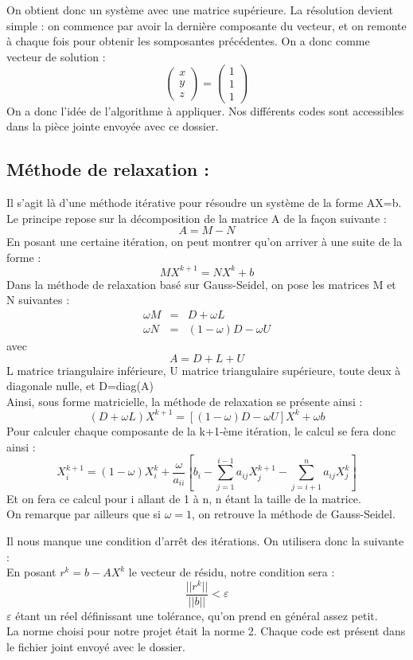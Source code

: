 \documentclass{article}
\theoremstyle{mes_theoremes}
\begin{document}
On obtient donc un système avec une matrice supérieure. La résolution devient simple : on commence par avoir la dernière composante du vecteur, et on remonte à chaque fois pour obtenir les somposantes précédentes. On a donc comme vecteur de solution : 
\[
\left(\begin{matrix}
   x\\
   y\\
   z
\end{matrix}\right)
=\left(\begin{matrix}
   1\\
   1\\
   1
\end{matrix}\right)
\]
On a donc l'idée de l'algorithme à appliquer. Nos différents codes sont accessibles dans la pièce jointe envoyée avec ce dossier.

\textcolor{bleu}{\section*{Méthode de relaxation :}} 
Il s'agit là d'une méthode itérative pour résoudre un système de la forme AX=b. Le principe repose sur la décomposition de la matrice A de la façon suivante : \[A=M-N\]
En posant une certaine itération, on peut montrer qu'on arriver à une suite de la forme : \[MX^{k+1}=NX^k + b\]
Dans la méthode de relaxation basé sur Gauss-Seidel, on pose les matrices M et N suivantes : \begin{eqnarray*}\omega M&=&D+\omega L\\ \omega N &=& (1-\omega)D-\omega U \end{eqnarray*} avec \[A=D+L+U\]
L matrice triangulaire inférieure, U matrice triangulaire supérieure, toute deux à diagonale nulle, et D=diag(A)\\
Ainsi, sous forme matricielle, la méthode de relaxation se présente ainsi :
\[(D+\omega L)X^{k+1}=[(1-\omega)D-\omega U]X^k +\omega b\]
Pour calculer chaque composante de la k+1-ème itération, le calcul se fera donc ainsi :
\[X_i^{k+1}=(1-\omega)X_i^k +\frac{\omega}{a_{ii}}\left[b_i -\sum_{j=1}^{i-1}a_{ij}X_j^{k+1}-\sum_{j=i+1}^n a_{ij}X_j^k\right]\]
Et on fera ce calcul pour i allant de 1 à n, n étant la taille de la matrice. \\
On remarque par ailleurs que si $\omega=1$, on retrouve la méthode de Gauss-Seidel.

\bigskip
Il nous manque une condition d'arrêt des itérations. On utilisera donc la suivante : \\
En posant $r^k=b-AX^k$ le vecteur de résidu, notre condition sera :
\[\frac{||r^k||}{||b||}<\varepsilon\]
$\varepsilon$ étant un réel définissant une tolérance, qu'on prend en général assez petit. \\
La norme choisi pour notre projet était la norme 2. Chaque code est présent dans le fichier joint envoyé avec le dossier.
\end{document}
